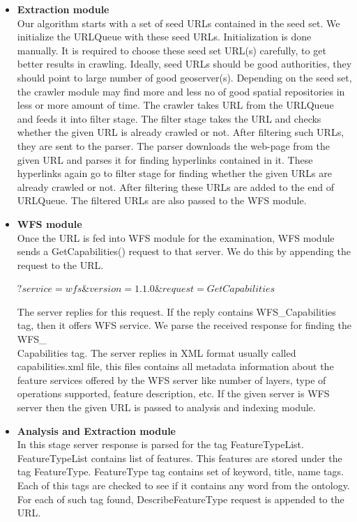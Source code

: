 \begin{itemize}

\item \textbf{Extraction module}\\
Our algorithm starts with a set of seed URLs contained in the seed set. We initialize the
URLQueue with these seed URLs. Initialization is done manually. It is required to choose these seed set URL(s) carefully, to get better results in crawling. Ideally, seed URLs should be good authorities, they should point to large number of good geoserver(s). Depending on the seed set, the crawler module may find more and less no of good spatial repositories in less or more amount of time. The crawler takes URL from the URLQueue and feeds it into filter stage. The filter stage takes the URL and checks
whether the given URL is already crawled or not. After filtering such URLs, they are sent to
the parser. The parser downloads the web-page from the given URL and parses it for finding
hyperlinks contained in it. These hyperlinks again go to filter stage for finding whether the
given URLs are already crawled or not. After filtering these URLs are added to the end of
URLQueue. The filtered URLs are also passed to the WFS module.\\

\item \textbf{WFS module}\\
Once the URL is fed into WFS module for the examination, WFS module sends a GetCapabilities() request to that server.
We do this by appending the request to the URL.
\begin{center}
$?
  service=wfs\&
  version=1.1.0\&
  request=GetCapabilities$
\end{center}
The server replies for this request. If the reply contains WFS\_Capabilities tag, then it offers
WFS service. We parse the received response for finding the WFS\_\\Capabilities tag. The server replies in XML format usually called capabilities.xml file, this files contains all metadata information about the feature services offered by the WFS server like number of layers, type of operations supported, feature description, etc. If the given
server is WFS server then the given URL is passed to analysis and indexing module.\\
\item \textbf{Analysis and Extraction module}\\
In this stage server response is parsed for the tag FeatureTypeList. FeatureTypeList
contains list of features. This features are stored under the tag FeatureType. FeatureType
tag contains set of keyword, title, name tags. Each of this tags are checked to see if it
contains any word from the ontology. For each of such tag found, DescribeFeatureType request
is appended to the URL.


\end{itemize}
